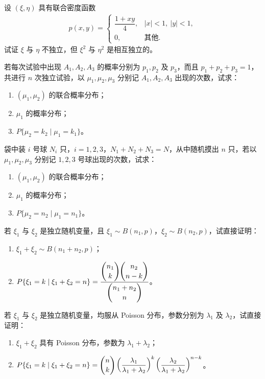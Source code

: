 \documentclass[../../main.tex]{subfiles}
\begin{document}
\begin{exercise}\label{exercise:ch03-22}
设 $(\xi,\eta)$ 具有联合密度函数
\begin{align*}p(x,y)=
\begin{cases}
\dfrac{1+xy}{4}, & |x|<1,\ |y|<1,\\
0, & \text{其他}.
\end{cases}\end{align*}
试证 $\xi$ 与 $\eta$ 不独立，但 $\xi^{2}$ 与 $\eta^{2}$ 是相互独立的。
\end{exercise}

\begin{exercise}\label{exercise:ch03-23}
若每次试验中出现 $A_1,A_2,A_3$ 的概率分别为 $p_1,p_2$ 及 $p_3$，而且 $p_1+p_2+p_3=1$，共进行 $n$ 次独立试验，以 $\mu_1,\mu_2,\mu_3$ 分别记 $A_1,A_2,A_3$ 出现的次数，试求：
\begin{enumerate}
\item $(\mu_1,\mu_2)$ 的联合概率分布；
\item $\mu_1$ 的概率分布；
\item $P\{\mu_2=k_2\mid\mu_1=k_1\}$。
\end{enumerate}
\end{exercise}

\begin{exercise}\label{exercise:ch03-24}
袋中装 $i$ 号球 $N_i$ 只，$i=1,2,3$，$N_1+N_2+N_3=N$，从中随机摸出 $n$ 只，若以 $\mu_1,\mu_2,\mu_3$ 分别记 $1,2,3$ 号球出现的次数，试求：
\begin{enumerate}
\item $(\mu_1,\mu_2)$ 的联合概率分布；
\item $\mu_1$ 的概率分布；
\item $P\{\mu_2=n_2\mid\mu_1=n_1\}$。
\end{enumerate}
\end{exercise}

\begin{exercise}\label{exercise:ch03-25}
若 $\xi_1$ 与 $\xi_2$ 是独立随机变量，且 $\xi_1\sim B(n_1,p)$，$\xi_2\sim B(n_2,p)$，试直接证明：
\begin{enumerate}
\item $\xi_1+\xi_2\sim B(n_1+n_2,p)$；
\item $P\{\xi_1=k\mid\xi_1+\xi_2=n\}=\dfrac{\dbinom{n_1}{k}\dbinom{n_2}{n-k}}{\dbinom{n_1+n_2}{n}}$。
\end{enumerate}
\end{exercise}

\begin{exercise}\label{exercise:ch03-26}
若 $\xi_1$ 与 $\xi_2$ 是独立随机变量，均服从 Poisson 分布，参数分别为 $\lambda_1$ 及 $\lambda_2$，试直接证明：
\begin{enumerate}
\item $\xi_1+\xi_2$ 具有 Poisson 分布，参数为 $\lambda_1+\lambda_2$；
\item $P\{\xi_1=k\mid\xi_1+\xi_2=n\}=\dbinom{n}{k}\left(\dfrac{\lambda_1}{\lambda_1+\lambda_2}\right)^{k}\left(\dfrac{\lambda_2}{\lambda_1+\lambda_2}\right)^{n-k}$。
\end{enumerate}
\end{exercise}
\end{document}
